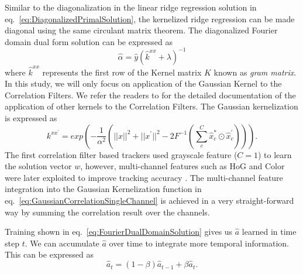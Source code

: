 \documentclass{bmvc2k}
\begin{document}
Similar to the diagonalization in the linear ridge regression
solution in eq.~\ref{eq:DiagonalizedPrimalSolution}, the kernelized
ridge regression can be made diagonal using the same circulant matrix
theorem.  The diagonalized Fourier domain dual form solution can be
expressed as
\begin{equation}
\hat{\alpha} = \hat{y}(\hat{k}^{xx}+\lambda)^{-1}
\label{eq:FourierDualDomainSolution}
\end{equation}
where $\hat{k}^{xx}$ represents the first row of the Kernel matrix $K$
known as \textit{gram matrix}. In this study, we will only focus on
application of the Gaussian Kernel to the Correlation Filters. We
refer the readers to \cite{henriques2015high} for the detailed
documentation of the application of other kernels to the Correlation
Filters. The Gaussian kernelization is
expressed as
\begin{equation}
k^{xx^{'}} = exp(-\dfrac{1}{\alpha^{2}}(||x||^{2}+||x^{'}||^{2}-2F^{-1}(\sum^{C}_{c}\hat{x}_{c}^{*}\odot \hat{x}_{c}^{'}))).
\label{eq:GaussianCorrelationSingleChannel}
\end{equation}
The first correlation filter based trackers used grayscale feature ($C=1$) to
learn the solution vector $w$, however, multi-channel features
such as HoG and Color were later exploited to improve tracking
accuracy \cite{henriques2015high,galoogahi2013multi,tang2015multi,ma2015long,bibi2015multi}. The
multi-channel feature integration into the Gaussian Kernelization
function in eq.~\ref{eq:GaussianCorrelationSingleChannel} is achieved
in a very straight-forward way by summing the correlation result over the channels.

Training shown in eq.~\ref{eq:FourierDualDomainSolution}
gives us $\hat{a}$ learned in time step $t$. We can accumulate
$\hat{a}$ over time to integrate more temporal information. This can
be expressed as
\begin{equation}
\hat{a}_{t} = (1-\beta)\hat{a}_{t-1} + \beta\hat{a}_{t}. 
\end{equation}
\end{document}
